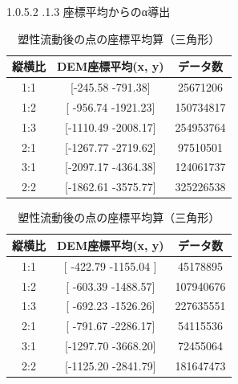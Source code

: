 \documentclass[12pt]{ltjsarticle}
\makeatletter
\renewcommand{\paragraph}{\@startsection{paragraph}{4}{\z@}%
  {1.0\Cvs \@plus.5\Cdp \@minus.2\Cdp}%
  {.1\Cvs \@plus.3\Cdp}%
  {\reset@font\sffamily\normalsize}
}
\makeatother
\begin{document}
\paragraph{座標平均からのα導出}
\begin{table}[htbp]
  \begin{minipage}[c]{.5\textwidth}
    \centering
    \begin{tabular}{ccc} \hline
      縦横比 & DEM座標平均(x, y) & データ数\\\hline
      1:1 & [-245.58 -791.38] & 25671206 \\
      1:2 & [ -956.74 -1921.23]& 150734817 \\
      1:3 & [-1110.49 -2008.17] & 254953764 \\ 
      2:1 & [-1267.77 -2719.62] & 97510501 \\
      3:1 & [-2097.17 -4364.38] & 124061737 \\
      2:2 &  [-1862.61 -3575.77] & 325226538 \\
    \end{tabular}
    \caption{塑性流動後の点の座標平均算（円）}
  \end{minipage}
  \begin{minipage}[c]{.5\textwidth}
    \centering
    \begin{tabular}{ccc} \hline
      縦横比 & DEM座標平均(x, y) & データ数\\\hline
      1:1 & [ -422.79 -1155.04 ] & 45178895 \\
      1:2 & [ -603.39 -1488.57] & 107940676 \\
      1:3 & [ -692.23  -1526.26] & 227635551 \\ 
      2:1 & [ -791.67 -2286.17] & 54115536 \\
      3:1 & [-1297.70 -3668.20] & 72455064 \\
      2:2 & [-1125.20 -2841.79] & 181647473 \\
    \end{tabular}
    \caption{塑性流動後の点の座標平均算（三角形）}
  \end{minipage}
\end{table}
\end{document}
